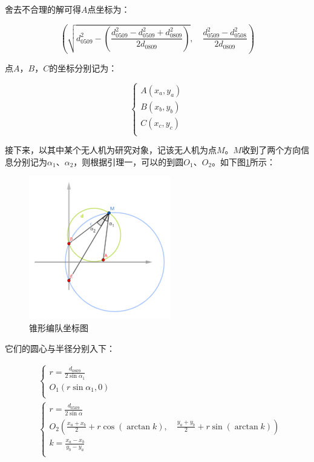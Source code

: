 舍去不合理的解可得$A$点坐标为：

\begin{equation}
    \left(
        \sqrt{d_{0509}^2 - \left(\frac{d_{0509}^2 - d_{0509}^2 + d_{0809}^2}{2d_{0809}}\right)}, \quad
        \frac{d_{0509}^2 - d_{0508}^2}{2d_{0809}}
    \right)
\end{equation}

点$A$，$B$，$C$的坐标分别记为：

\begin{equation}
    \begin{cases}
        A(x_a, y_a) \\
        B(x_b, y_b) \\
        C(x_c, y_c) \\
    \end{cases}
\end{equation}

接下来，以其中某个无人机为研究对象，记该无人机为点$M$。$M$收到了两个方向信息分别记为$\alpha_1$、$\alpha_2$，则根据引理一，可以的到圆$O_1$、$O_2$。如下图\ref{figure112104}所示：

\begin{figure}[h]
    \centering
    \includegraphics[scale=0.7]{res/figure112104.png}
    \caption{锥形编队坐标图}
    \label{figure112104}
\end{figure}

它们的圆心与半径分别入下：

\begin{align}
    &\begin{cases}
        r = \frac{d_{0809}}{2\sin\alpha_1}  \\
        O_1(r\sin\alpha_1, 0)   \\
    \end{cases} \\
    &\begin{cases}
        r = \frac{d_{0509}}{2\sin\alpha}    \\
        O_2 \left(
            \frac{x_a + x_b}{2} + r\cos(\arctan k), \quad
            \frac{y_a + y_b}{2} + r\sin(\arctan k)
        \right) \\
        k = \frac{x_a - x_b}{y_b - y_a} \\
    \end{cases}
\end{align}

